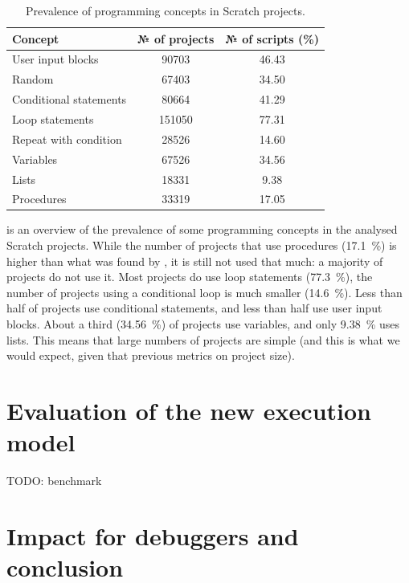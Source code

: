 \documentclass[../main]{subfiles}
\begin{document}
\begin{table}
    \centering
    \caption{Prevalence of programming concepts in Scratch projects.}
    \label{tab:scratch-programming-concepts}
    \begin{tabular}{|l|S[table-format=6.0]|S|}
        \hline
        {Concept} & {№ of projects} & {№ of scripts (\%)} \\
        \hline
        User input blocks & 90703 & 46.43 \\
        Random & 67403 & 34.50 \\
        \hline
        Conditional statements & 80664 & 41.29 \\
        Loop statements & 151050 & 77.31 \\
        Repeat with condition & 28526 & 14.60 \\
        \hline
        Variables & 67526 & 34.56 \\
        Lists & 18331 & 9.38 \\
        \hline
        Procedures & 33319 & 17.05 \\
        \hline
    \end{tabular}
\end{table}

 is an overview of the prevalence of some programming concepts in the analysed Scratch projects.
While the number of projects that use procedures (\qty{17.1}{\percent}) is higher than what was found by \textcite{aivaloglouHowKidsCode2016}, it is still not used that much: a majority of projects do not use it.
Most projects do use loop statements (\qty{77.3}{\percent}), the number of projects using a conditional loop is much smaller (\qty{14.6}{\percent}).
Less than half of projects use conditional statements, and less than half use user input blocks.
About a third (\qty{34.56}{\percent}) of projects use variables, and only \qty{9.38}{\percent} uses lists.
This means that large numbers of projects are simple (and this is what we would expect, given that previous metrics on project size).

\section{Evaluation of the new execution model}\label{sec:evaluation-of-the-new-execution-model}

TODO: benchmark

\section{Impact for debuggers and conclusion}\label{sec:conclusion}
\end{document}
